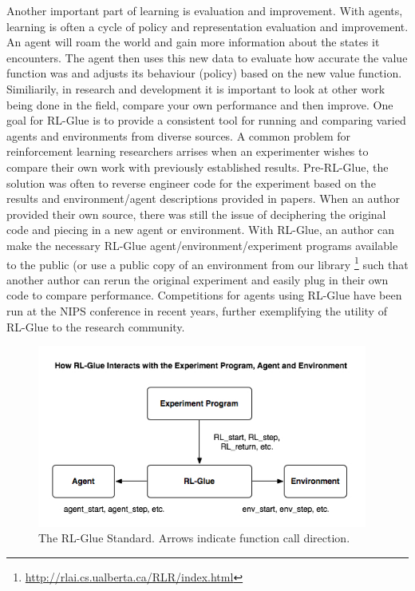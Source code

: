 \documentclass[11pt]{article}
\begin{document}
Another important part of learning is evaluation and improvement. With agents, learning is often a cycle of policy and representation evaluation and improvement.  An agent will roam the world and gain more information about the states it encounters. The agent then uses this new data to evaluate how accurate the value function was and adjusts its behaviour (policy) based on the new value function. Similiarily, in research and development it is important to look at other work being done in the field, compare your own performance and then improve. One goal for RL-Glue is to provide a consistent tool for running and comparing varied agents and environments from diverse sources. A common problem for reinforcement learning researchers arrises when an experimenter wishes to compare their own work with previously established results. Pre-RL-Glue, the solution was often to reverse engineer code for the experiment based on the results and environment/agent descriptions provided in papers.  When an author provided their own source, there was still the issue of deciphering the original code and piecing in a new agent or environment. With RL-Glue, an author can make the necessary RL-Glue agent/environment/experiment programs  available to the public (or use a public copy of an environment from our library \footnote{\url{http://rlai.cs.ualberta.ca/RLR/index.html}} such that another author can rerun the original experiment and easily plug in their own code to compare performance.  Competitions for agents using RL-Glue have been run at the NIPS conference in recent years, further exemplifying the utility of RL-Glue to the research community.
 
\begin{figure}
\label{fig1}
\begin{center}
\includegraphics[height=60mm]{images/glue_connections_no_shadow.png}
\caption{\small The RL-Glue Standard. Arrows indicate function call direction.}
\end{center}
\end{figure}
\end{document}

